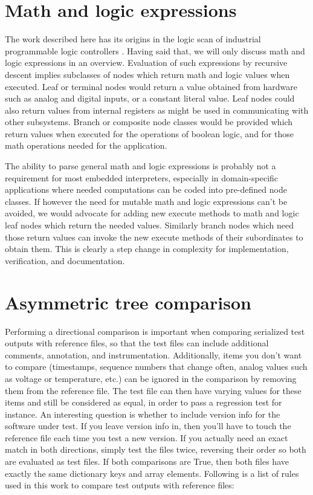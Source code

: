 \documentclass[a4paper,10pt]{article}
\begin{document}
\section{Math and logic expressions}

The work described here has its origins in the logic scan of industrial programmable logic controllers \cite{JEReich, compilerTest}. Having said that, we will only discuss math and logic expressions in an overview. Evaluation of such expressions by recursive descent implies subclasses of nodes which return math and logic values when executed. Leaf or terminal nodes would return a value obtained from hardware such as analog and digital inputs, or a constant literal value. Leaf nodes could also return values from internal registers as might be used in communicating with other subsystems. Branch or composite node classes would be provided which return values when executed for the operations of boolean logic, and for those math operations needed for the application.

The ability to parse general math and logic expressions is probably not a requirement for most embedded interpreters, especially in domain-specific applications where needed computations can be coded into pre-defined node classes. If however the need for mutable math and logic expressions can't be avoided, we would advocate for adding new execute methods to math and logic leaf nodes which return the needed values. Similarly branch nodes which need those return values can invoke the new execute methods of their subordinates to obtain them. This is clearly a step change in complexity for implementation, verification, and documentation. 

\section{Asymmetric tree comparison}\label{asymmetricComparison}
Performing a directional comparison is important when comparing serialized test outputs with reference files, so that the test files can include additional comments, annotation, and instrumentation. Additionally, items you don't want to compare (timestamps, sequence numbers that change often, analog values such as voltage or temperature, etc.) can be ignored in the comparison by removing them from the reference file. The test file can then have varying values for these items and still be considered as equal, in order to pass a regression test for instance. An interesting question is whether to include version info for the software under test. If you leave version info in, then you'll have to touch the reference file each time you test a new version. If you actually need an exact match in both directions, simply test the files twice, reversing their order so both are evaluated as test files. If both comparisons are True, then both files have exactly the same dictionary keys and array elements. Following is a list of rules used in this work to compare test outputs with reference files:
\end{document}
